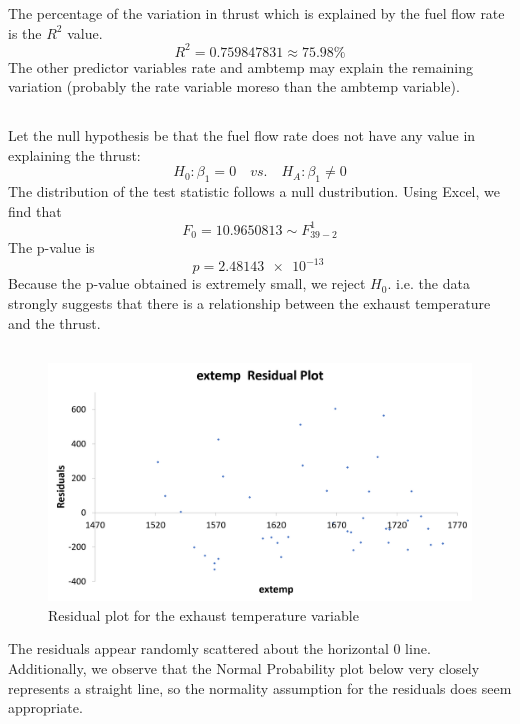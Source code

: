 \documentclass[letterpaper]{article}
\begin{document}
The percentage of the variation in thrust which is explained by the fuel flow rate
is the $R^2$ value.
$$R^2 = 0.759847831 \approx 75.98\%$$
The other predictor variables rate and ambtemp may explain the remaining variation
(probably the rate variable moreso than the ambtemp variable).

\subsection{}

Let the null hypothesis be that the fuel flow rate does not have any value in explaining the thrust:
$$ H_0: \beta_1 =0 \quad vs. \quad H_A: \beta_1 \neq 0 $$
The distribution of the test statistic follows a null dustribution.
Using Excel, we find that
$$F_0 = 10.9650813 \sim F_{39-2}^{1}$$
The p-value is
$$p= \SI{2.48143e-13}{} $$
Because the p-value obtained is extremely small, we reject $H_0$. i.e. the data strongly suggests that there is a relationship between the exhaust temperature and the thrust.

\setcounter{subsection}{6}
\subsection{}

\begin{figure}[H]
 \centering
 \includegraphics[width=\textwidth]{extempresidual.png}
 \caption{Residual plot for the exhaust temperature variable}
\end{figure}
The residuals appear randomly scattered about the horizontal 0 line.
Additionally, we observe that the Normal Probability plot below
very closely represents a straight line, so the normality assumption for the
residuals does seem appropriate.
\end{document}
